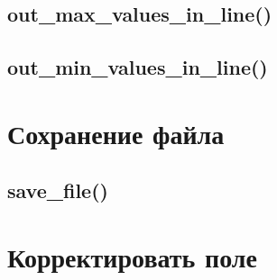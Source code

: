 \documentclass[12pt, a4paper]{article}
\begin{document}



\subsection{out\_max\_values\_in\_line()}






\subsection{out\_min\_values\_in\_line()}






\section{Сохранение файла}


\subsection{save\_file()}






\section{Корректировать поле}
\end{document}
